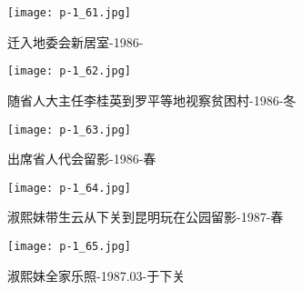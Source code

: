 \clearpage


\begin{figure}
    \begin{center}
        \texttt{[image: p-1\_61.jpg]}
        \begin{shaded}
            \caption{迁入地委会新居室-1986-}
        \end{shaded}
    \end{center}
\end{figure}

\clearpage


\begin{figure}
    \begin{center}
        \texttt{[image: p-1\_62.jpg]}
        \begin{shaded}
            \caption{随省人大主任李桂英到罗平等地视察贫困村-1986-冬}
        \end{shaded}
    \end{center}
\end{figure}

\clearpage


\begin{figure}
    \begin{center}
        \texttt{[image: p-1\_63.jpg]}
        \begin{shaded}
            \caption{出席省人代会留影-1986-春}
        \end{shaded}
    \end{center}
\end{figure}

\clearpage


\begin{figure}
    \begin{center}
        \texttt{[image: p-1\_64.jpg]}
        \begin{shaded}
            \caption{淑熙妹带生云从下关到昆明玩在公园留影-1987-春}
        \end{shaded}
    \end{center}
\end{figure}

\clearpage


\begin{figure}
    \begin{center}
        \texttt{[image: p-1\_65.jpg]}
        \begin{shaded}
            \caption{淑熙妹全家乐照-1987.03-于下关}
        \end{shaded}
    \end{center}
\end{figure}

